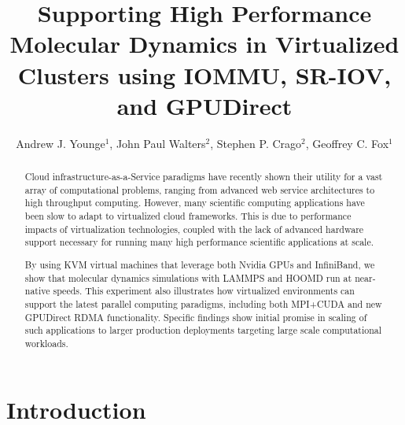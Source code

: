 \documentclass[10pt]{sigplanconf}
\title{Supporting High Performance Molecular Dynamics in Virtualized Clusters using IOMMU, SR-IOV, and GPUDirect}
\subtitle{\large{Andrew J. Younge$^1$, John Paul Walters$^2$, Stephen P. Crago$^2$, Geoffrey C. Fox$^1$}}
\begin{document}
\maketitle
\begin{abstract}

Cloud infrastructure-as-a-Service paradigms have recently shown their utility for a vast array of computational problems, ranging from advanced web service architectures to high throughput computing.  However, many scientific computing applications have been slow to adapt to virtualized cloud frameworks. This is due to performance impacts of virtualization technologies, coupled with the lack of advanced hardware support necessary for running many high performance scientific applications at scale. 

By using KVM virtual machines that leverage both Nvidia GPUs and InfiniBand, we show that molecular dynamics simulations with LAMMPS and HOOMD run at near-native speeds. This experiment also illustrates how virtualized environments can support the latest parallel computing paradigms, including both MPI+CUDA and new GPUDirect RDMA functionality. Specific findings show initial promise in scaling of such applications to larger production deployments targeting large scale computational workloads.  


 



\end{abstract}

\section{Introduction}
\end{document}
